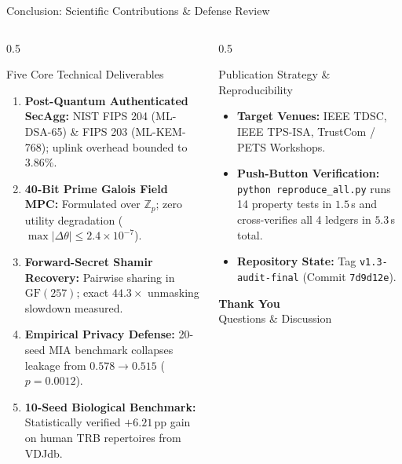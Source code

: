 \documentclass[aspectratio=169,10pt]{beamer}
\begin{document}
\begin{frame}{Conclusion: Scientific Contributions & Defense Review}
  \begin{columns}[T]
    \begin{column}{0.5\textwidth}
      \begin{block}{Five Core Technical Deliverables}
        \scriptsize
        \begin{enumerate}[itemsep=2pt]
          \item \textbf{Post-Quantum Authenticated SecAgg:} NIST FIPS 204 (ML-DSA-65) \& FIPS 203 (ML-KEM-768); uplink overhead bounded to $3.86\%$.
          \item \textbf{40-Bit Prime Galois Field MPC:} Formulated over $\mathbb{Z}_p$; zero utility degradation ($\max|\Delta\theta| \le 2.4 \times 10^{-7}$).
          \item \textbf{Forward-Secret Shamir Recovery:} Pairwise sharing in $\text{GF}(257)$; exact $44.3\times$ unmasking slowdown measured.
          \item \textbf{Empirical Privacy Defense:} 20-seed MIA benchmark collapses leakage from $0.578 \to 0.515$ ($p=0.0012$).
          \item \textbf{10-Seed Biological Benchmark:} Statistically verified $+6.21$\,pp gain on human TRB repertoires from VDJdb.
        \end{enumerate}
      \end{block}
    \end{column}
    \begin{column}{0.5\textwidth}
      \begin{block}{Publication Strategy & Reproducibility}
        \scriptsize
        \begin{itemize}[itemsep=2pt]
          \item \textbf{Target Venues:} IEEE TDSC, IEEE TPS-ISA, TrustCom / PETS Workshops.
          \item \textbf{Push-Button Verification:} \texttt{python reproduce\_all.py} runs 14 property tests in $1.5$\,s and cross-verifies all 4 ledgers in $5.3$\,s total.
          \item \textbf{Repository State:} Tag \texttt{v1.3-audit-final} (Commit \texttt{7d9d12e}).
        \end{itemize}
      \end{block}
      \vspace{0.2cm}
      \centering
      {\Large \textbf{Thank You}}\\[0.1cm]
      {\small Questions \& Discussion}
    \end{column}
  \end{columns}
\end{frame}
\end{document}
